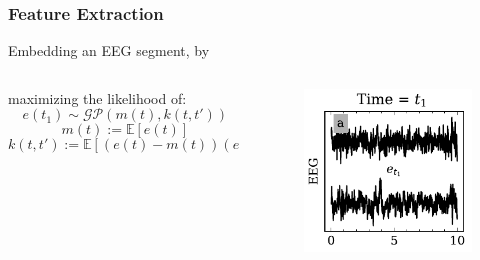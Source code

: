 \documentclass[t]{beamer}
\theoremstyle{definition}
\def\baselineskip{}%
\begin{document}
\subsubsection{Feature Extraction}

\begin{frame}{Embedding an EEG segment, by}

\begin{columns}[T] %
    
    \begin{column}{0.618\textwidth} %

    \begin{block}{maximizing the likelihood of:}
        $$e(t_1) \sim \mathcal{GP}(m(t), k(t, t'))$$
        $$m(t) := \mathbb{E}[e(t)]$$
        $$k(t, t') := \mathbb{E}[(e(t) - m(t))(e(t') - m(t'))]$$
    \end{block}
    
    \end{column}
    
    \begin{column}{0.382\textwidth} %
    \vspace{-\baselineskip}
    \begin{figure}
        \centering
        \includegraphics[width=\textwidth]{figs/eeg_sample.pdf}
        \label{fig:my_label}
    \end{figure}
    

\end{column}
\end{columns}
\end{frame}
\end{document}
